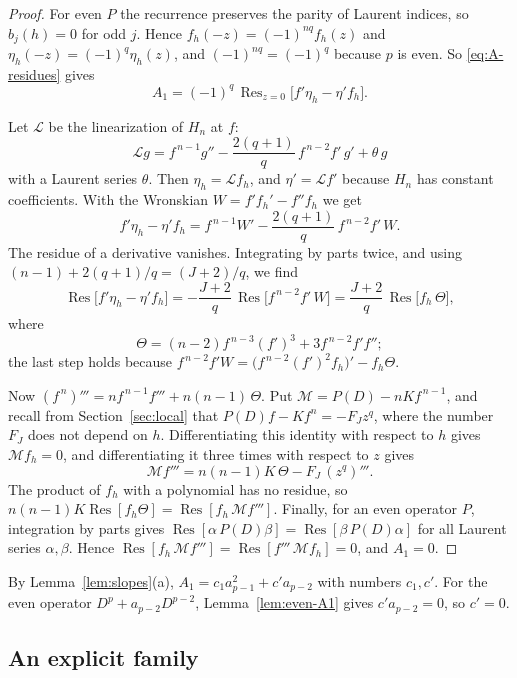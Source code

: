 \documentclass[11pt]{article}
\theoremstyle{definition}
\theoremstyle{remark}
\numberwithin{equation}{section}
\DeclareMathOperator{\Res}{Res}
\begin{document}
\begin{proof}
For even \(P\) the recurrence preserves the parity of Laurent indices,
so \(b_j(h)=0\) for odd \(j\). Hence \(f_h(-z)=(-1)^{nq}f_h(z)\) and
\(\eta_h(-z)=(-1)^{q}\eta_h(z)\), and \((-1)^{nq}=(-1)^q\) because \(p\)
is even. So \eqref{eq:A-residues} gives
\[
 A_1=(-1)^q\,\Res_{z=0}\bigl[f'\eta_h-\eta'f_h\bigr].
\]

Let \(\mathcal L\) be the linearization of \(H_n\) at \(f\):
\[
 \mathcal L g=f^{\,n-1}g''-\frac{2(q+1)}{q}\,f^{\,n-2}f'\,g'+\theta\,g
\]
with a Laurent series \(\theta\). Then \(\eta_h=\mathcal Lf_h\), and
\(\eta'=\mathcal Lf'\) because \(H_n\) has constant coefficients. With
the Wronskian \(W=f'f_h'-f''f_h\) we get
\[
 f'\eta_h-\eta'f_h=f^{\,n-1}W'-\frac{2(q+1)}{q}\,f^{\,n-2}f'\,W .
\]
The residue of a derivative vanishes. Integrating by parts twice, and
using \((n-1)+2(q+1)/q=(J+2)/q\), we find
\[
 \Res\bigl[f'\eta_h-\eta'f_h\bigr]=-\frac{J+2}{q}\,\Res\bigl[f^{\,n-2}f'\,W\bigr]
 =\frac{J+2}{q}\,\Res\bigl[f_h\,\Theta\bigr],
\]
where
\[
 \Theta=(n-2)f^{\,n-3}(f')^3+3f^{\,n-2}f'f'' ;
\]
the last step holds because
\(f^{\,n-2}f'W=\bigl(f^{\,n-2}(f')^2f_h\bigr)'-f_h\Theta\).

Now \((f^{\,n})'''=n f^{\,n-1}f'''+n(n-1)\,\Theta\). Put
\(\mathcal M=P(D)-nKf^{\,n-1}\), and recall from
Section~\ref{sec:local} that \(P(D)f-Kf^n=-F_Jz^q\), where the number
\(F_J\) does not depend on \(h\). Differentiating this identity with
respect to \(h\) gives \(\mathcal Mf_h=0\), and differentiating it
three times with respect to \(z\) gives
\[
 \mathcal Mf'''=n(n-1)K\,\Theta-F_J\,(z^q)''' .
\]
The product of \(f_h\) with a polynomial has no residue, so
\(n(n-1)K\Res[f_h\Theta]=\Res[f_h\,\mathcal Mf''']\). Finally, for an even
operator \(P\), integration by parts gives
\(\Res[\alpha\,P(D)\beta]=\Res[\beta\,P(D)\alpha]\) for all Laurent
series \(\alpha,\beta\). Hence \(\Res[f_h\,\mathcal Mf''']
=\Res[f'''\,\mathcal Mf_h]=0\), and \(A_1=0\).
\end{proof}

By Lemma~\ref{lem:slopes}(a), \(A_1=c_1a_{p-1}^2+c'a_{p-2}\) with numbers
\(c_1,c'\). For the even operator \(D^p+a_{p-2}D^{p-2}\),
Lemma~\ref{lem:even-A1} gives \(c'a_{p-2}=0\), so \(c'=0\).

\subsection{An explicit family}
\end{document}
